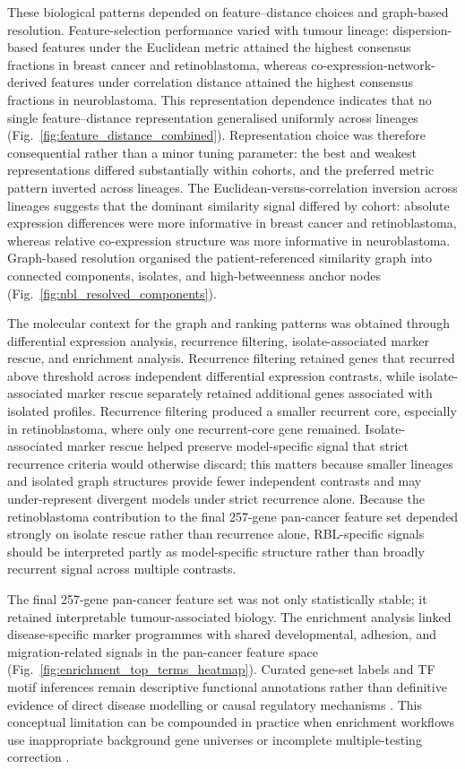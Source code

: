 These biological patterns depended on feature--distance choices and graph-based
resolution. Feature-selection performance varied with tumour lineage:
dispersion-based features under the Euclidean metric attained the highest
consensus fractions in breast cancer and retinoblastoma, whereas
co-expression-network-derived features under correlation distance attained the
highest consensus fractions in neuroblastoma. This representation dependence
indicates that no single feature--distance representation generalised uniformly
across lineages (Fig.~\ref{fig:feature_distance_combined}). Representation
choice was therefore consequential rather than a minor tuning parameter: the
best and weakest representations differed substantially within cohorts, and the
preferred metric pattern inverted across lineages. The
Euclidean-versus-correlation inversion across lineages suggests that the
dominant similarity signal differed by cohort: absolute expression differences
were more informative in breast cancer and retinoblastoma, whereas relative
co-expression structure was more informative in neuroblastoma.
Graph-based resolution organised the patient-referenced similarity graph into
connected components, isolates, and high-betweenness anchor nodes
(Fig.~\ref{fig:nbl_resolved_components}).

The molecular context for the graph and ranking patterns was obtained through
differential expression analysis, recurrence filtering, isolate-associated
marker rescue, and enrichment analysis. Recurrence filtering retained genes
that recurred above threshold across independent differential expression
contrasts, while isolate-associated marker rescue separately retained
additional genes associated with isolated profiles. Recurrence filtering
produced a smaller recurrent core, especially in retinoblastoma, where
only one recurrent-core gene remained. Isolate-associated marker rescue helped
preserve model-specific signal that strict recurrence criteria would otherwise
discard; this matters because smaller lineages and isolated graph structures
provide fewer independent contrasts and may under-represent divergent models
under strict recurrence alone. Because the retinoblastoma contribution to the
final 257-gene pan-cancer feature set depended strongly on isolate rescue rather
than recurrence alone, RBL-specific signals should be interpreted partly as
model-specific structure rather than broadly recurrent signal across multiple
contrasts.

The final 257-gene pan-cancer feature set was not only statistically stable; it
retained interpretable tumour-associated biology. The enrichment analysis linked
disease-specific marker programmes with shared developmental, adhesion, and
migration-related signals in the pan-cancer feature space
(Fig.~\ref{fig:enrichment_top_terms_heatmap}). Curated gene-set labels and TF
motif inferences remain descriptive functional annotations rather than
definitive evidence of direct disease modelling or causal regulatory mechanisms
\citep{Khatri2012PathwayAnalysis}. This conceptual limitation can be compounded
in practice when enrichment workflows use inappropriate background gene
universes or incomplete multiple-testing correction
\citep{Wijesooriya2022Enrichment}.

